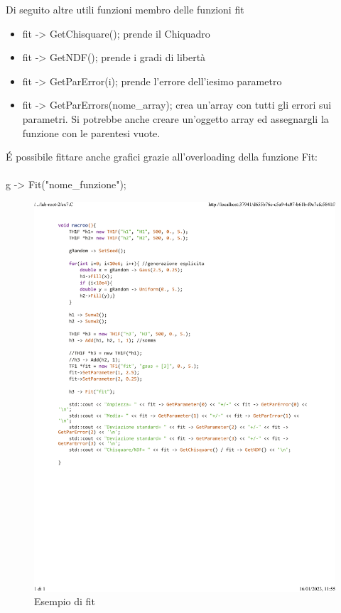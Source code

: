 \documentclass[10pt,a4paper]{article}
\begin{document}
Di seguito altre utili funzioni membro delle funzioni fit
\begin{itemize}
	\item fit -> GetChisquare(); 
	prende il Chiquadro
	\item fit -> GetNDF();
	prende i gradi di libertà
	\item fit -> GetParError(i);
	prende l'errore dell'iesimo parametro
	\item fit -> GetParErrors(nome\_array);
	crea un'array con tutti gli errori sui parametri. Si potrebbe anche creare un'oggetto array ed assegnargli la funzione con le parentesi vuote.
\end{itemize}
\'{E} possibile fittare anche grafici grazie all'overloading della funzione Fit:\\\\
g -> Fit("nome\_funzione");\\
\begin{figure}[h!]
	\centering
	\includegraphics[width=1.\linewidth]{_..._lab-root-2_ex7.C}
	\caption{Esempio di fit}
\end{figure}
\end{document}
